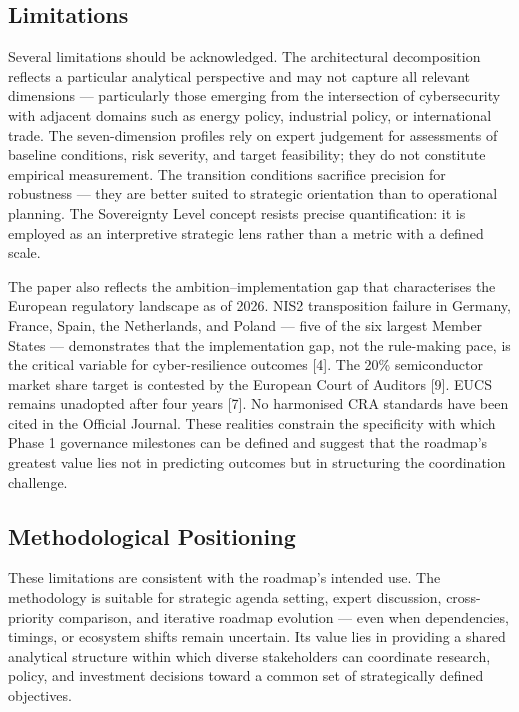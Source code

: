 \documentclass{ieeeaccess}
\begin{document}
\subsection{Limitations}\label{limitations}

Several limitations should be acknowledged. The architectural
decomposition reflects a particular analytical perspective and may not
capture all relevant dimensions --- particularly those emerging from the
intersection of cybersecurity with adjacent domains such as energy
policy, industrial policy, or international trade. The seven-dimension
profiles rely on expert judgement for assessments of baseline
conditions, risk severity, and target feasibility; they do not
constitute empirical measurement. The transition conditions sacrifice
precision for robustness --- they are better suited to strategic
orientation than to operational planning. The Sovereignty Level concept
resists precise quantification: it is employed as an interpretive
strategic lens rather than a metric with a defined scale.

The paper also reflects the ambition--implementation gap that
characterises the European regulatory landscape as of 2026. NIS2
transposition failure in Germany, France, Spain, the Netherlands, and
Poland --- five of the six largest Member States --- demonstrates that
the implementation gap, not the rule-making pace, is the critical
variable for cyber-resilience outcomes {[}4{]}. The 20\% semiconductor
market share target is contested by the European Court of Auditors
{[}9{]}. EUCS remains unadopted after four years {[}7{]}. No harmonised
CRA standards have been cited in the Official Journal. These realities
constrain the specificity with which Phase 1 governance milestones can
be defined and suggest that the roadmap's greatest value lies not in
predicting outcomes but in structuring the coordination challenge.

\subsection{Methodological
Positioning}\label{methodological-positioning}

These limitations are consistent with the roadmap's intended use. The
methodology is suitable for strategic agenda setting, expert discussion,
cross-priority comparison, and iterative roadmap evolution --- even when
dependencies, timings, or ecosystem shifts remain uncertain. Its value
lies in providing a shared analytical structure within which diverse
stakeholders can coordinate research, policy, and investment decisions
toward a common set of strategically defined objectives.
\end{document}
